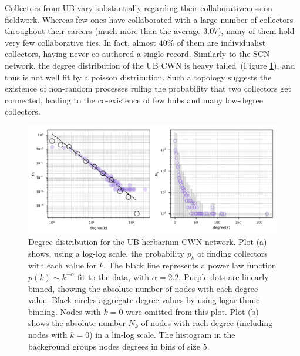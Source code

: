 Collectors from UB vary substantially regarding their collaborativeness on fieldwork.
Whereas few ones have collaborated with a large number of collectors throughout their careers (much more than the average $3.07$), many of them hold very few collaborative ties.
In fact, almost $40\%$ of them are individualist collectors, having never co-authored a single record.
%
Similarly to the SCN network, the degree distribution of the UB CWN is heavy tailed~(Figure \ref{fig:ub_cwn_degree_dist}), and thus is not well fit by a poisson distribution.
Such a topology suggests the existence of non-random processes ruling the probability that two collectors get connected, leading to the co-existence of few hubs and many low-degree collectors.
\begin{figure}[!ht]
  	\centering
    \includegraphics[width=\linewidth]{figures/casestudy_ub/cwn_degree_dist.pdf}
    \caption[Degree distribution for the UB CWN]{ Degree distribution for the UB herbarium CWN network. Plot (a) shows, using a log-log scale, the probability $p_k$ of finding collectors with each value for $k$. The black line represents a power law function $p(k) \sim k^{-\alpha}$ fit to the data, with $\alpha=2.2$. Purple dots are linearly binned, showing the absolute number of nodes with each degree value. Black circles aggregate degree values by using logarithmic binning. Nodes with $k=0$ were omitted from this plot. Plot (b) shows the absolute number $N_k$ of nodes with each degree (including nodes with $k=0$) in a lin-log scale. The histogram in the background groups nodes degrees in bins of size $5$. }
    \label{fig:ub_cwn_degree_dist}
\end{figure}

